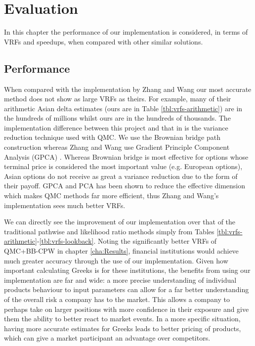 \chapter{Evaluation} \label{cha:Evaluation}
In this chapter the performance of our implementation is considered, in terms of VRFs and speedups, when compared with other similar solutions.


\section{Performance}
When compared with the implementation by Zhang and Wang \cite{ZhangConditionalQuasiMonteCarloMethod} our most accurate method does not show as large VRFs as theirs. For example, many of their arithmetic Asian delta estimates (ours are in Table \ref{tbl:vrfs-arithmetic}) are in the hundreds of millions whilst ours are in the hundreds of thousands. The implementation difference between this project and that in \cite{ZhangConditionalQuasiMonteCarloMethod} is the variance reduction technique used with QMC. We use the Brownian bridge path construction whereas Zhang and Wang use Gradient Principle Component Analysis (GPCA) \cite{gpca}. Whereas Brownian bridge is most effective for options whose terminal price is considered the most important value (e.g. European options), Asian options do not receive as great a variance reduction due to the form of their payoff. GPCA and PCA has been shown to reduce the effective dimension which makes QMC methods far more efficient, thus Zhang and Wang's implementation sees much better VRFs.

We can directly see the improvement of our implementation over that of the traditional pathwise and likelihood ratio methods simply from Tables \ref{tbl:vrfs-arithmetic}-\ref{tbl:vrfs-lookback}. Noting the significantly better VRFs of QMC+BB-CPW in chapter \ref{cha:Results}, financial institutions would achieve much greater accuracy through the use of our implementation. Given how important calculating Greeks is for these institutions, the benefits from using our implementation are far and wide: a more precise understanding of individual products behaviour to input parameters can allow for a far better understanding of the overall risk a company has to the market. This allows a company to perhaps take on larger positions with more confidence in their exposure and give them the ability to better react to market events. In a more specific situation, having more accurate estimates for Greeks leads to better pricing of products, which can give a market participant an advantage over competitors.

